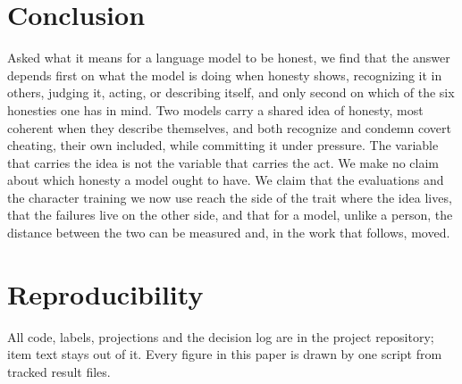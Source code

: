 \documentclass[11pt]{article}
\begin{document}
\section{Conclusion}

Asked what it means for a language model to be honest, we find that the answer depends first on what the model is
doing when honesty shows, recognizing it in others, judging it, acting, or describing itself, and only second on which
of the six honesties one has in mind. Two models carry a shared idea of honesty, most coherent when they describe
themselves, and both recognize and condemn covert cheating, their own included, while committing it under pressure.
The variable that carries the idea is not the variable that carries the act. We make no claim about which honesty a
model ought to have. We claim that the evaluations and the character training we now use reach the side of the trait
where the idea lives, that the failures live on the other side, and that for a model, unlike a person, the distance
between the two can be measured and, in the work that follows, moved.

\section*{Reproducibility}
All code, labels, projections and the decision log are in the project repository; item text stays out of it. Every
figure in this paper is drawn by one script from tracked result files.




\appendix
\end{document}
